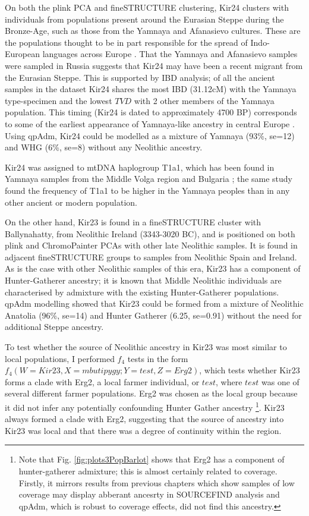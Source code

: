 On both the plink PCA and fineSTRUCTURE clustering, Kir24 clusters with individuals from populations present around the Eurasian Steppe during the Bronze-Age, such as those from the Yamnaya and Afanasievo cultures. These are the populations thought to be in part responsible for the spread of Indo-European languages across Europe \cite{Haak2015}.  That the Yamnaya and Afanasievo samples were sampled in Russia suggests that Kir24 may have been a recent migrant from the Eurasian Steppe. This is supported by IBD analysis; of all the ancient samples in the dataset Kir24 shares the most IBD (31.12cM) with the Yamnaya type-specimen and the lowest $TVD$ with 2 other members of the Yamnaya population. This timing (Kir24 is dated to approximately 4700 BP) corresponds to some of the earliest appearance of Yamnaya-like ancestry in central Europe \cite{Racimo8989}. Using qpAdm, Kir24 could be modelled as a mixture of Yamnaya (93\%, se=12) and WHG (6\%, se=8) without any Neolithic ancestry. 

Kir24 was assigned to mtDNA haplogroup T1a1, which has been found in Yamnaya samples from the Middle Volga region and Bulgaria \cite{keyser2009ancient}; the same study found the frequency of T1a1 to be higher in the Yamnaya peoples than in any other ancient or modern population. 

On the other hand, Kir23 is found in a fineSTRUCTURE cluster with Ballynahatty, from Neolithic Ireland (3343-3020 BC), and is positioned on both plink and ChromoPainter PCAs with other late Neolithic samples. It is found in adjacent fineSTRUCTURE groups to samples from Neolithic Spain and Ireland. As is the case with other Neolithic samples of this era, Kir23 has a component of Hunter-Gatherer ancestry; it is known that Middle Neolithic individuals are characterised by admixture with the existing Hunter-Gatherer populations. qpAdm modelling showed that Kir23 could be formed from a mixture of Neolithic Anatolia (96\%, se=14)  and Hunter Gatherer (6.25, se=0.91) without the need for additional Steppe ancestry. 

To test whether the source of Neolithic ancestry in Kir23 was most similar to local populations, I performed $f_{4}$ tests in the form $f_{4}(W=Kir23, X=mbutipygy; Y=test, Z=Erg2)$, which tests whether Kir23 forms a clade with Erg2, a local farmer individual, or $test$, where $test$ was one of several different farmer populations. Erg2 was chosen as the local group because it did not infer any potentially confounding Hunter Gather ancestry \footnote{Note that Fig. \ref{fig:plots3PopBarlot} shows that Erg2 has a component of hunter-gatherer admixture; this is almost certainly related to coverage. Firstly, it mirrors results from previous chapters which show samples of low coverage may display abberant ancesrty in SOURCEFIND analysis and qpAdm, which is robust to coverage effects, did not find this ancestry.}. Kir23 always formed a clade with Erg2, suggesting that the source of ancestry into Kir23 was local and that there was a degree of continuity within the region. 



